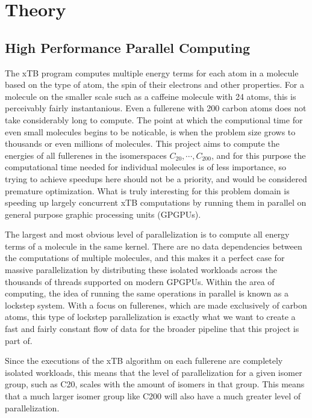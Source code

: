 \section{Theory}

\subsection{High Performance Parallel Computing}

The xTB program computes multiple energy terms for each atom in a molecule based on the type of atom, the spin of their electrons and other properties.
For a molecule on the smaller scale such as a caffeine molecule with 24 atoms, this is perceivably fairly instantanious. Even a fullerene with 200 carbon atoms does not take considerably long to compute. The point at which the computional time for even small molecules begins to be noticable, is when the problem size grows to thousands or even millions of molecules.
This project aims to compute the energies of all fullerenes in the isomerspaces \(C_{20}, \cdots, C_{200} \), and for this purpose the computational time needed for individual molecules is of less importance, so trying to achieve speedups here should not be a priority, and would be considered premature optimization. What is truly interesting for this problem domain is speeding up largely concurrent xTB computations by running them in parallel on general purpose graphic processing units (GPGPUs).

The largest and most obvious level of parallelization is to compute all energy terms of a molecule in the same kernel. There are no data dependencies between the computations of multiple molecules, and this makes it a perfect case for massive parallelization by distributing these isolated workloads across the thousands of threads supported on modern GPGPUs.
Within the area of computing, the idea of running the same operations in parallel is known as a lockstep system. With a focus on fullerenes, which are made exclusively of carbon atoms, this type of lockstep parallelization is exactly what we want to create a fast and fairly constant flow of data for the broader pipeline that this project is part of.

Since the executions of the xTB algorithm on each fullerene are completely isolated workloads, this means that the level of parallelization for a given isomer group, such as C20, scales with the amount of isomers in that group. This means that a much larger isomer group like C200 will also have a much greater level of parallelization.



